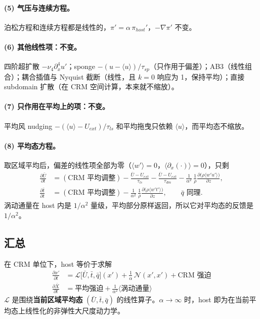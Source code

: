 \documentclass[11pt,a4paper]{article}
\newcommand{\avg}[1]{\langle #1\rangle}
\newcommand{\pd}[2]{\frac{\partial #1}{\partial #2}}
\newcommand{\aI}{\frac{1}{\alpha}}
\begin{document}
\paragraph{(5) 气压与连续方程。}
泊松方程和连续方程都是线性的，$\pi'=\alpha\,\pi_{host}'$，$-\nabla\pi'$ 不变。

\paragraph{(6) 其他线性项：不变。}
四阶超扩散 $-\nu_4\partial_x^4 u'$；sponge $-(u-\avg u)/\tau_{sp}$（只作用于偏差）；AB3（线性组合）；耦合插值与 Nyquist 截断（线性，且 $k=0$ 响应为 1，保持平均）；直接 subdomain 扩散（在 CRM 空间计算，本来就不缩放）。

\paragraph{(7) 只作用在平均上的项：不变。}
平均风 nudging $-(\avg u - U_{ext})/\tau_{ls}$ 和平均拖曳只依赖 $\avg u$，而平均态不缩放。

\paragraph{(8) 平均态方程。}
取区域平均后，偏差的线性项全部为零（$\avg{w'}=0$，$\avg{\partial_x(\cdot)}=0$），只剩
\begin{align}
\pd{\bar U}{t} &= (\text{CRM 平均调整}) - \frac{\bar U-U_{ext}}{\tau_{ls}} - \frac{\bar U-U_{ext}}{\tau_{dm}}
 - \frac{1}{\alpha^2}\,\frac{1}{\rho}\pd{\big(\rho\avg{w'u'}\big)}{z},\\
\pd{\bar t}{t} &= (\text{CRM 平均调整}) - \frac{1}{\alpha^2}\,\frac{1}{\rho}\pd{\big(\rho\avg{w't'}\big)}{z},
\qquad \bar q \text{ 同理}.
\end{align}
涡动通量在 host 内是 $1/\alpha^2$ 量级，平均部分原样返回，所以它对平均态的反馈是 $1/\alpha^2$。

\subsection{汇总}

在 CRM 单位下，host 等价于求解
\begin{equation}
\boxed{\begin{aligned}
\pd{x'}{t} &= \mathcal{L}\big[\bar U,\bar t,\bar q\big](x') + \aI\,\mathcal{N}(x',x') + \text{CRM 强迫}\\
\pd{\bar X}{t} &= \text{平均强迫} + \frac{1}{\alpha^2}\avg{\text{涡动通量}}
\end{aligned}}
\end{equation}
$\mathcal{L}$ 是围绕\textbf{当前区域平均态} $(\bar U,\bar t,\bar q)$ 的线性算子。$\alpha\to\infty$ 时，host 即为在当前平均态上线性化的非弹性大尺度动力学。
\end{document}
